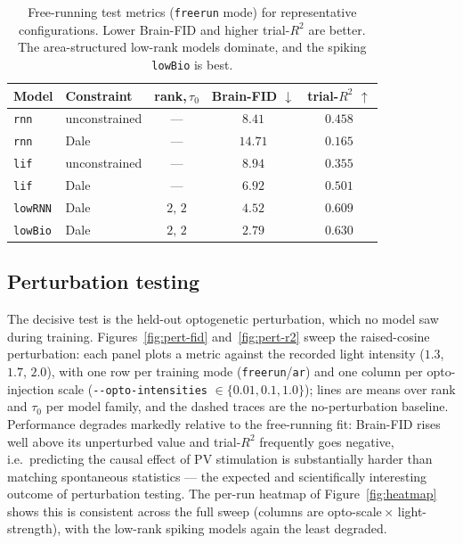 \documentclass[11pt]{article}
\newcommand{\code}[1]{\texttt{#1}}
\begin{document}
\begin{table}[t]
\centering
\small
\begin{tabular}{@{}llccc@{}}
\toprule
Model & Constraint & rank,\,$\tau_0$ & Brain-FID $\downarrow$ & trial-$R^2$ $\uparrow$ \\
\midrule
\code{rnn}    & unconstrained & ---       & $8.41$  & $0.458$ \\
\code{rnn}    & Dale          & ---       & $14.71$ & $0.165$ \\
\code{lif}    & unconstrained & ---       & $8.94$  & $0.355$ \\
\code{lif}    & Dale          & ---       & $6.92$  & $0.501$ \\
\code{lowRNN} & Dale          & $2,\,2$   & $4.52$  & $0.609$ \\
\code{lowBio} & Dale          & $2,\,2$   & $\mathbf{2.79}$  & $\mathbf{0.630}$ \\
\bottomrule
\end{tabular}
\caption{Free-running test metrics (\code{freerun} mode) for representative
configurations. Lower Brain-FID and higher trial-$R^2$ are better. The
area-structured low-rank models dominate, and the spiking \code{lowBio} is best.}
\label{tab:freerun}
\end{table}

\subsection{Perturbation testing}
The decisive test is the held-out optogenetic perturbation, which no model saw
during training. Figures~\ref{fig:pert-fid} and~\ref{fig:pert-r2} sweep the
raised-cosine perturbation: each panel plots a metric against the recorded light
intensity ($1.3$, $1.7$, $2.0$), with one row per training mode
(\code{freerun}/\code{ar}) and one column per opto-injection scale
(\code{-{}-opto-intensities} $\in\{0.01,0.1,1.0\}$); lines are means over rank and
$\tau_0$ per model family, and the dashed traces are the no-perturbation baseline.
Performance degrades markedly relative to the free-running fit: Brain-FID rises
well above its unperturbed value and trial-$R^2$ frequently goes negative, i.e.\
predicting the causal effect of PV stimulation is substantially harder than
matching spontaneous statistics --- the expected and scientifically interesting
outcome of perturbation testing. The per-run heatmap of Figure~\ref{fig:heatmap}
shows this is consistent across the full sweep (columns are opto-scale\,$\times$
light-strength), with the low-rank spiking models again the least degraded.
\end{document}
